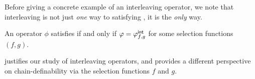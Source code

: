 Before giving a concrete example of an interleaving operator, we note that
interleaving is not just \emph{one} way to satisfying , it
is the \emph{only} way.

\begin{theorem}
   \label{tourn_result_chaindef_iff_interleaving}

    An operator $\phi$ satisfies  if and only if $\varphi =
    {\varphi_{f,g}^\mathsf{int}}$ for some selection functions $(f, g)$.

\end{theorem}

 justifies our study of interleaving
operators, and provides a different perspective on chain-definability via the
selection functions $f$ and $g$.

